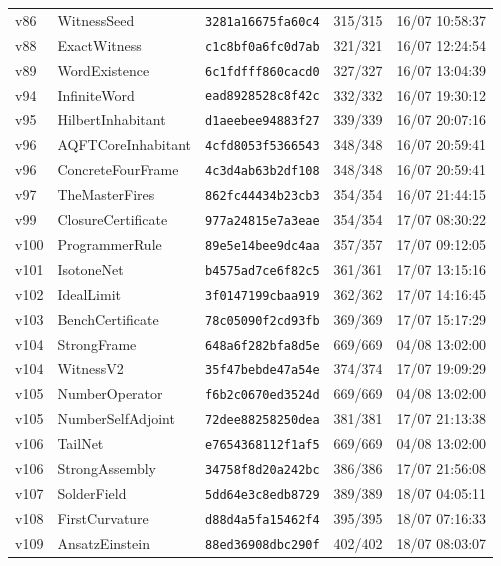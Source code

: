 \documentclass[11pt]{article}
\theoremstyle{definition}\newtheorem{deriv}{Derivation}
\begin{document}
{\begin{longtable}{@{}lllll@{}}
v86 & WitnessSeed & \texttt{3281a16675fa60c4} & 315/315 & 16/07 10:58:37 \\
v88 & ExactWitness & \texttt{c1c8bf0a6fc0d7ab} & 321/321 & 16/07 12:24:54 \\
v89 & WordExistence & \texttt{6c1fdfff860cacd0} & 327/327 & 16/07 13:04:39 \\
v94 & InfiniteWord & \texttt{ead8928528c8f42c} & 332/332 & 16/07 19:30:12 \\
v95 & HilbertInhabitant & \texttt{d1aeebee94883f27} & 339/339 & 16/07 20:07:16 \\
v96 & AQFTCoreInhabitant & \texttt{4cfd8053f5366543} & 348/348 & 16/07 20:59:41 \\
v96 & ConcreteFourFrame & \texttt{4c3d4ab63b2df108} & 348/348 & 16/07 20:59:41 \\
v97 & TheMasterFires & \texttt{862fc44434b23cb3} & 354/354 & 16/07 21:44:15 \\
v99 & ClosureCertificate & \texttt{977a24815e7a3eae} & 354/354 & 17/07 08:30:22 \\
v100 & ProgrammerRule & \texttt{89e5e14bee9dc4aa} & 357/357 & 17/07 09:12:05 \\
v101 & IsotoneNet & \texttt{b4575ad7ce6f82c5} & 361/361 & 17/07 13:15:16 \\
v102 & IdealLimit & \texttt{3f0147199cbaa919} & 362/362 & 17/07 14:16:45 \\
v103 & BenchCertificate & \texttt{78c05090f2cd93fb} & 369/369 & 17/07 15:17:29 \\
v104 & StrongFrame & \texttt{648a6f282bfa8d5e} & 669/669 & 04/08 13:02:00 \\
v104 & WitnessV2 & \texttt{35f47bebde47a54e} & 374/374 & 17/07 19:09:29 \\
v105 & NumberOperator & \texttt{f6b2c0670ed3524d} & 669/669 & 04/08 13:02:00 \\
v105 & NumberSelfAdjoint & \texttt{72dee88258250dea} & 381/381 & 17/07 21:13:38 \\
v106 & TailNet & \texttt{e7654368112f1af5} & 669/669 & 04/08 13:02:00 \\
v106 & StrongAssembly & \texttt{34758f8d20a242bc} & 386/386 & 17/07 21:56:08 \\
v107 & SolderField & \texttt{5dd64e3c8edb8729} & 389/389 & 18/07 04:05:11 \\
v108 & FirstCurvature & \texttt{d88d4a5fa15462f4} & 395/395 & 18/07 07:16:33 \\
v109 & AnsatzEinstein & \texttt{88ed36908dbc290f} & 402/402 & 18/07 08:03:07 \\

\end{longtable}}
\end{document}
